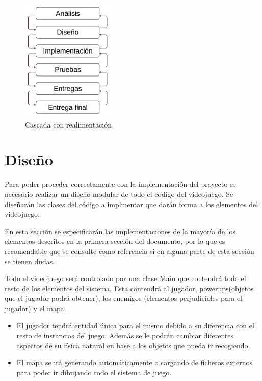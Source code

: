 \documentclass[palatino]{apuntes}
\begin{document}
\begin{figure}[hbtp]
    \centering
    \includegraphics[width=0.4\textwidth]{img/cascada.png}
    \caption{Cascada con realimentación}
    \label{fig:cascadarealimentacion}
\end{figure}





\section{Diseño}

Para poder proceder correctamente con la implementación del proyecto es necesario realizar un diseño modular de todo el código del videojuego. Se diseñarán las clases del código a implmentar que darán forma a los elementos del videojuego.

En esta sección se especificarán las implementaciones de la mayoría de los elementos descritos en la primera sección del documento, por lo que es recomendable que se consulte como referencia si en alguna parte de esta sección se tienen dudas.

Todo el videojuego será controlado por una clase Main que contendrá todo el resto de los elementos del sistema. Esta contendrá al jugador, powerups(objetos que el jugador podrá obtener), los enemigos (elementos perjudiciales para el jugador) y el mapa.

\begin{itemize}
	\item El jugador tendrá entidad única para el mismo debido a su diferencia con el resto de instancias del juego. Además se le podrán cambiar diferentes aspectos de su física natural en base a los objetos que pueda ir recogiendo.

	\item El mapa se irá generando automáticamente o cargando de ficheros externos para poder ir dibujando todo el sistema de juego.
\end{itemize}
\end{document}
